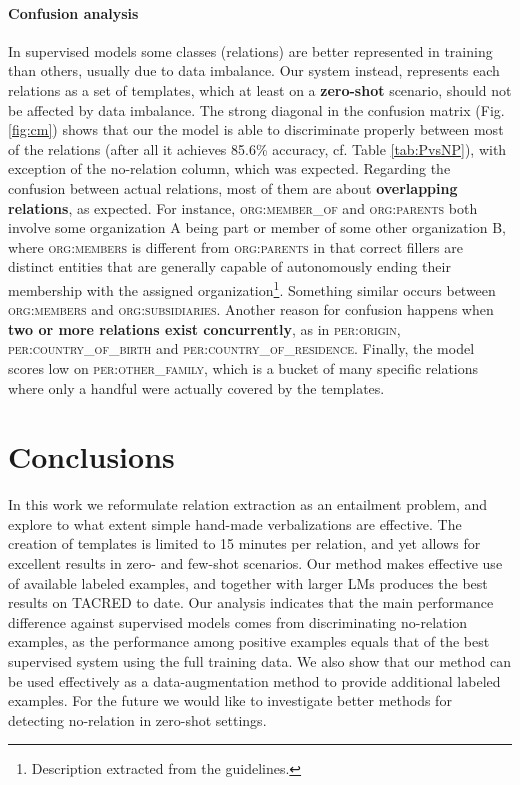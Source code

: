 \documentclass[11pt]{article}
\begin{document}
\paragraph{Confusion analysis} In supervised models some classes (relations) are better represented in training than others, usually due to data imbalance. Our system instead, represents each relations as a set of templates, which at least on a \textbf{zero-shot} scenario, should not be affected by data imbalance. The strong diagonal in the confusion matrix (Fig. \ref{fig:cm}) shows that our the model is able to discriminate properly between most of the relations (after all it achieves 85.6\% accuracy, cf. Table \ref{tab:PvsNP}), with exception of the no-relation column, which was expected. Regarding the confusion between actual relations, most of them are about \textbf{overlapping relations}, as expected. For instance, \textsc{org:member\_of} and \textsc{org:parents} both involve some organization A being part or member of some other organization B, where \textsc{org:members} is different from \textsc{org:parents}  in that correct fillers are distinct entities that are generally capable of autonomously ending their membership with the assigned organization\footnote{Description extracted from the guidelines.}. Something similar occurs between \textsc{org:members} and \textsc{org:subsidiaries}. Another reason for confusion happens when \textbf{two or more relations exist concurrently}, as in \textsc{per:origin}, \textsc{per:country\_of\_birth} and \textsc{per:country\_of\_residence}. Finally, the model scores low on \textsc{per:other\_family}, which is a bucket of many specific relations where only a handful were actually covered by the templates. 


\section{Conclusions}
In this work we reformulate relation extraction as an entailment problem, and explore to what extent simple hand-made verbalizations are effective.  The creation of templates is limited to 15 minutes per relation, and yet allows for excellent results in zero- and few-shot scenarios. Our method makes effective use of available labeled examples, and together with larger LMs produces the best results on TACRED to date. Our analysis indicates that the main performance difference against supervised models comes from discriminating no-relation examples, as the performance among positive examples equals that of the best supervised system using the full training data. We also show that our method can be used effectively as a data-augmentation method to provide additional labeled examples. For the future we would like to investigate better methods for detecting no-relation in zero-shot settings.
\end{document}
